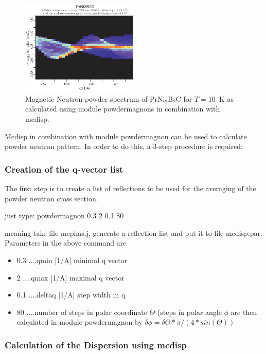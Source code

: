 \begin{figure}[tb]%
\begin{center}\leavevmode
\includegraphics[angle=0, width=0.5\textwidth]{figsrc/contour10K_070504.eps}
\end{center}
\caption{Magnetic Neutron powder spectrum of PrNi$_2$B$_2$C for $T=10$~K  as calculated using module {\prg %
powdermagnons} in combination with {\prg 
mcdisp}.}\label{prni2b2c_10K}
\end{figure}

{\prg Mcdisp} in combination with module {\prg powdermagnon} can be used to calculate
powder neutron pattern. In order to do this, a 3-step procedure is required:

\subsubsection{Creation of the q-vector list}
The first step is to create a list of reflections to be used for 
the averaging of the powder neutron cross section. 

just type: powdermagnon 0.3 2 0.1 80

meaning take file {\prg mcphas.j}, generate a reflection list and put it to 
file {\prg mcdisp.par}. Parameters in the above command are 
\begin{itemize}
\item
 0.3 ....qmin   [1/A] minimal q vector
\item
 2   ....qmax   [1/A] maximal q vector
\item
 0.1 ....deltaq [1/A] step width in q
\item
 80  ....number of steps in polar coordinate $\Theta$
        (steps in polar angle $\phi$ are  then calculated in module
        {\prg powdermagnon} by $\delta \phi= \delta \Theta*\pi/(4*sin(\Theta))$
\end{itemize}

\subsubsection{Calculation of the Dispersion using {\prg mcdisp}}

